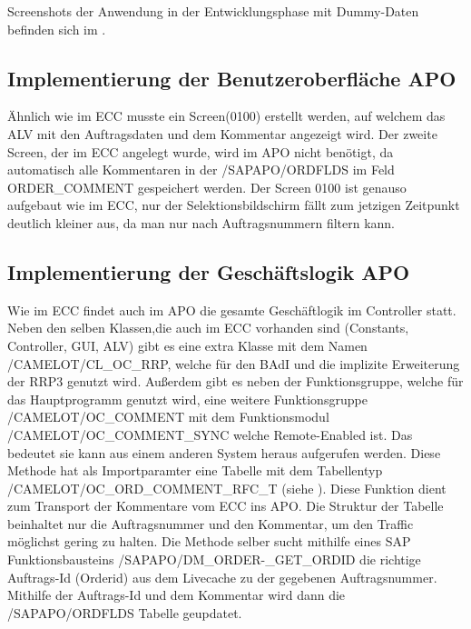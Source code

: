 Screenshots der Anwendung in der Entwicklungsphase mit Dummy-Daten befinden sich im .

\subsection{Implementierung der Benutzeroberfläche APO}
\label{sec:Implementierung der Benutzeroberfläche APO} 
Ähnlich wie im \ac{ECC} musste ein Screen(0100) erstellt werden, auf welchem das \ac{ALV} mit den Auftragsdaten und dem Kommentar angezeigt wird. Der zweite Screen, der im \ac{ECC} angelegt wurde, wird im \ac{APO} nicht benötigt, da automatisch alle Kommentaren in der /SAPAPO/ORDFLDS im Feld ORDER\_COMMENT gespeichert werden. Der Screen 0100 ist genauso aufgebaut wie im \ac{ECC}, nur der Selektionsbildschirm fällt zum jetzigen Zeitpunkt deutlich kleiner aus, da man nur nach Auftragsnummern filtern kann.  

\subsection{Implementierung der Geschäftslogik APO}
\label{sec:Implementierung der Geschäftslogik APO}  
Wie im \ac{ECC} findet auch im \ac{APO} die gesamte Geschäftlogik im Controller statt. Neben den selben Klassen,die auch im \ac{ECC} vorhanden sind (Constants, Controller, \ac{GUI}, \ac{ALV}) gibt es eine extra Klasse mit dem Namen /CAMELOT/CL\_OC\_RRP, welche für den \ac{BAdI} und die implizite Erweiterung der RRP3 genutzt wird. Außerdem gibt es neben der Funktionsgruppe, welche für das Hauptprogramm genutzt wird, eine weitere Funktionsgruppe /CAMELOT/OC\_COMMENT mit dem Funktionsmodul /CAMELOT/OC\_COMMENT\_SYNC welche Remote-Enabled ist. Das bedeutet sie kann aus einem anderen System heraus aufgerufen werden. Diese Methode hat als Importparamter eine Tabelle mit dem Tabellentyp /CAMELOT/OC\_ORD\_COMMENT\_RFC\_T (siehe ). Diese Funktion dient zum Transport der Kommentare vom \ac{ECC} ins \ac{APO}. Die Struktur der Tabelle beinhaltet nur die Auftragsnummer und den Kommentar, um den Traffic möglichst gering zu halten. Die Methode selber sucht mithilfe eines SAP Funktionsbausteins /SAPAPO/DM\_ORDER-\_GET\_ORDID die richtige Auftrags-Id (Orderid) aus dem Livecache zu der gegebenen Auftragsnummer. Mithilfe der Auftrags-Id und dem Kommentar wird dann die /SAPAPO/ORDFLDS Tabelle geupdatet.  

